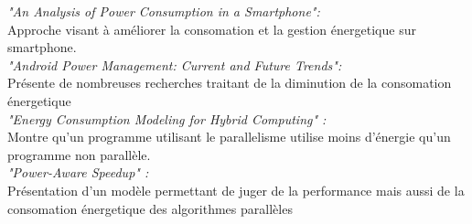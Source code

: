 	\textit {"An Analysis of Power Consumption in a Smartphone":}\\
		Approche visant à améliorer la consomation et la gestion énergetique sur smartphone.\\

	\textit {"Android Power Management: Current and Future Trends":}\\
		Présente de nombreuses recherches traitant de la diminution de la consomation énergetique \\

	\textit {"Energy Consumption Modeling for Hybrid Computing" :}\\
		Montre qu'un programme utilisant le parallelisme utilise moins d'énergie qu'un programme non parallèle.\\

	\textit {"Power-Aware Speedup" :}\\
		Présentation d'un modèle permettant de juger de la performance mais aussi de la consomation énergetique des algorithmes parallèles\\